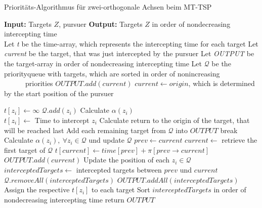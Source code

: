 \documentclass[german,version-2019-11]{uzl-thesis}
\begin{document}
\begin{minipage}{1\linewidth}
\begin{algorithm}[H]
\begin{algorithmic}
\caption{Prioritäts-Algorithmus für zwei-orthogonale Achsen beim MT-TSP}
\label{alg:2OA.1}
\State \textbf{Input:} Targets $Z$, pursuer
\State \textbf{Output:} Targets $Z$ in order of nondecreasing intercepting time\\

\State Let \emph{t} be the time-array, which represents the intercepting time for each target
\State Let \emph{current} be the target, that was just intercepted by the pursuer
\State Let \emph{OUTPUT} be the target-array in order of nondecreasing intercepting time
\State Let $\mathcal{Q}$ be the priorityqueue with targets, which are sorted in order of nonincreasing \\~~~~~~priorities
\State $OUTPUT.add(current)$
\State $current\leftarrow origin$, which is determined by the start position of the pursuer

\State $t[z_i] \leftarrow \infty$
\State $\mathcal{Q}.add(z_i)$
\State Calculate $\alpha(z_i)$
\EndFor\\

\State $t[z_i] \leftarrow$ Time to intercept $z_i$ 
\EndFor
\State Calculate return to the origin of the target, that will be reached last
\State Add each remaining target from $\mathcal{Q}$ into $OUTPUT$
\State break
\EndIf \\

\State Calculate $\alpha(z_i),~\forall z_i\in\mathcal{Q}$ und update $\mathcal{Q}$
\State $prev\leftarrow current$
\State $current \leftarrow$ retrieve the first target of $\mathcal{Q}$
\State $t[current] \leftarrow time[prev] + \pi[prev\rightarrow current]$
\State $OUTPUT.add(current)$
\State Update the position of each $z_i\in\mathcal{Q}$
\State $interceptedTargets \leftarrow$ intercepted targets between $prev$ und $current$
\State $\mathcal{Q}.removeAll(interceptedTargets)$
\State $OUTPUT.addAll(interceptedTargets)$
\EndWhile\\

\State Assign the respective $t[z_i]$ to each target
\State Sort $interceptedTargets$ in order of nondecreasing intercepting time 
\State return $OUTPUT$
\end{algorithmic}
\end{algorithm}
\end{minipage}
\end{document}
